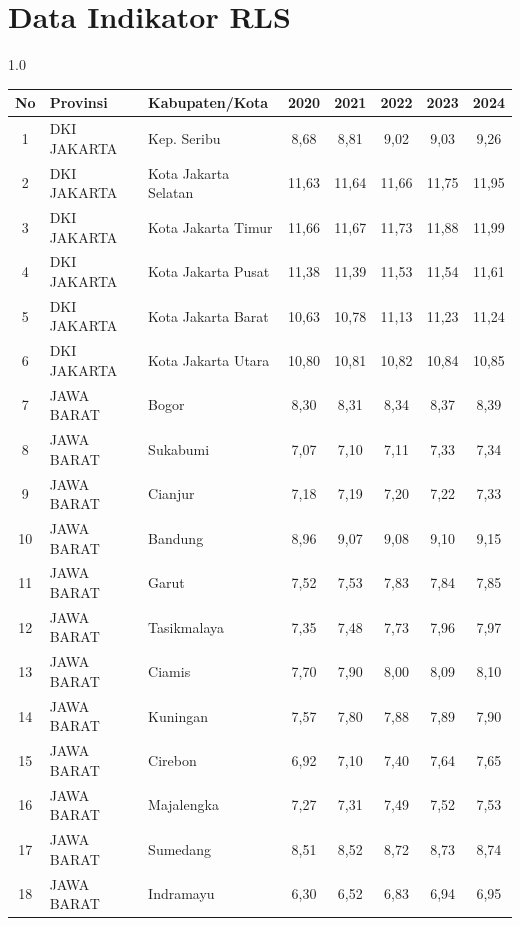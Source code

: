 \section*{Data Indikator RLS}
\begin{spacing}{1.0}
\scriptsize
\setlength{\tabcolsep}{2pt}
\begin{longtable}{|c|p{2.2cm}|p{2.8cm}|c|c|c|c|c|}
\hline
\textbf{No} & \textbf{Provinsi} & \textbf{Kabupaten/Kota} & \textbf{2020} & \textbf{2021} & \textbf{2022} & \textbf{2023} & \textbf{2024} \\ \hline
\endhead
1 & DKI JAKARTA & Kep. Seribu & 8,68 & 8,81 & 9,02 & 9,03 & 9,26 \\ \hline
2 & DKI JAKARTA & Kota Jakarta Selatan & 11,63 & 11,64 & 11,66 & 11,75 & 11,95 \\ \hline
3 & DKI JAKARTA & Kota Jakarta Timur & 11,66 & 11,67 & 11,73 & 11,88 & 11,99 \\ \hline
4 & DKI JAKARTA & Kota Jakarta Pusat & 11,38 & 11,39 & 11,53 & 11,54 & 11,61 \\ \hline
5 & DKI JAKARTA & Kota Jakarta Barat & 10,63 & 10,78 & 11,13 & 11,23 & 11,24 \\ \hline
6 & DKI JAKARTA & Kota Jakarta Utara & 10,80 & 10,81 & 10,82 & 10,84 & 10,85 \\ \hline
7 & JAWA BARAT & Bogor & 8,30 & 8,31 & 8,34 & 8,37 & 8,39 \\ \hline
8 & JAWA BARAT & Sukabumi & 7,07 & 7,10 & 7,11 & 7,33 & 7,34 \\ \hline
9 & JAWA BARAT & Cianjur & 7,18 & 7,19 & 7,20 & 7,22 & 7,33 \\ \hline
10 & JAWA BARAT & Bandung & 8,96 & 9,07 & 9,08 & 9,10 & 9,15 \\ \hline
11 & JAWA BARAT & Garut & 7,52 & 7,53 & 7,83 & 7,84 & 7,85 \\ \hline
12 & JAWA BARAT & Tasikmalaya & 7,35 & 7,48 & 7,73 & 7,96 & 7,97 \\ \hline
13 & JAWA BARAT & Ciamis & 7,70 & 7,90 & 8,00 & 8,09 & 8,10 \\ \hline
14 & JAWA BARAT & Kuningan & 7,57 & 7,80 & 7,88 & 7,89 & 7,90 \\ \hline
15 & JAWA BARAT & Cirebon & 6,92 & 7,10 & 7,40 & 7,64 & 7,65 \\ \hline
16 & JAWA BARAT & Majalengka & 7,27 & 7,31 & 7,49 & 7,52 & 7,53 \\ \hline
17 & JAWA BARAT & Sumedang & 8,51 & 8,52 & 8,72 & 8,73 & 8,74 \\ \hline
18 & JAWA BARAT & Indramayu & 6,30 & 6,52 & 6,83 & 6,94 & 6,95 \\ \hline

\end{longtable}
\end{spacing}
